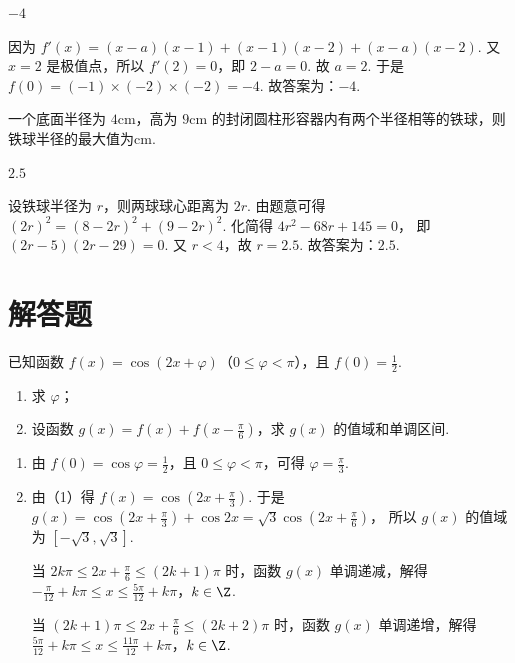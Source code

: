 \begin{answer}
\(-4\)
\end{answer}

\begin{solution}
因为
\(f'(x)=(x-a)(x-1)+(x-1)(x-2)+(x-a)(x-2)\).
又 \(x=2\) 是极值点，所以 \(f'(2)=0\)，即
\(2-a=0\).
故 \(a=2\). 于是
\(f(0)=(-1)\times(-2)\times(-2)=-4\).
故答案为：\(-4\).
\end{solution}

\begin{problem}
一个底面半径为 \(4\text{cm}\)，高为 \(9\text{cm}\) 的封闭圆柱形容器内有两个半径相等的铁球，则铁球半径的最大值为\fillinblank{}\(\text{cm}\).
\end{problem}

\begin{answer}
\(2.5\)
\end{answer}

\begin{solution}
设铁球半径为 \(r\)，则两球球心距离为 \(2r\). 由题意可得
\((2r)^2=(8-2r)^2+(9-2r)^2\).
化简得
\(4r^2-68r+145=0\)，
即
\((2r-5)(2r-29)=0\).
又 \(r<4\)，故 \(r=2.5\). 故答案为：\(2.5\).
\end{solution}
\section{解答题}

\begin{problem}
已知函数 \(f(x)=\cos(2x+\varphi)\)（\(0\le \varphi<\pi\)），且 \(f(0)=\frac12\).
\begin{enumerate}
\item 求 \(\varphi\)；
\item 设函数 \(g(x)=f(x)+f\left(x-\frac{\pi}{6}\right)\)，求 \(g(x)\) 的值域和单调区间.
\end{enumerate}
\end{problem}

\begin{solution}
\begin{enumerate}
\item 由 \(f(0)=\cos\varphi=\frac12\)，且 \(0\le \varphi<\pi\)，可得
\(\varphi=\frac{\pi}{3}\).

\item 由（1）得
\(f(x)=\cos\left(2x+\frac{\pi}{3}\right)\).
于是
\(
g(x)=\cos\left(2x+\frac{\pi}{3}\right)+\cos 2x
=\sqrt3\cos\left(2x+\frac{\pi}{6}\right)
\)，
所以 \(g(x)\) 的值域为
\([-\sqrt3,\sqrt3]\).

当
\(2k\pi\le 2x+\frac{\pi}{6}\le (2k+1)\pi\)
时，函数 \(g(x)\) 单调递减，解得
\(-\frac{\pi}{12}+k\pi\le x\le \frac{5\pi}{12}+k\pi\)，\(k\in\Z\).

当
\((2k+1)\pi\le 2x+\frac{\pi}{6}\le (2k+2)\pi\)
时，函数 \(g(x)\) 单调递增，解得
\(\frac{5\pi}{12}+k\pi\le x\le \frac{11\pi}{12}+k\pi\)，\(k\in\Z\).
\end{enumerate}
\end{solution}

